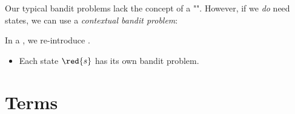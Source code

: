         Our typical bandit problems lack the concept of a "". However, if we \textit{do} need states, we can use a \textit{contextual bandit problem}:\\

        \begin{definition}
            In a , we re-introduce .

            \begin{itemize}
                \item Each state $\red{s}$ has its own bandit problem.
            \end{itemize}
        \end{definition}

    
    


\pagebreak

\section{Terms}

